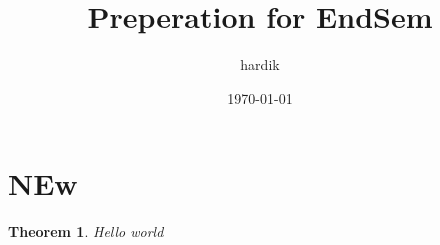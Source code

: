 \documentclass{article}
\title{Preperation for EndSem}
\author{hardik}
\date{\today}
\begin{document}
\maketitle
\section{NEw}
\newtheorem{mydef}{Theorem}
\begin{mydef}
Hello world
\end{mydef}
\end{document}
